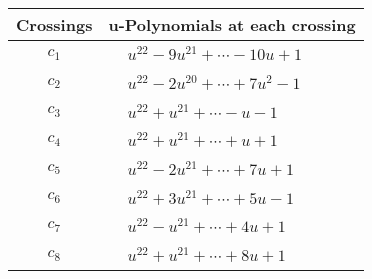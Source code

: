 \documentclass[1p]{elsarticle_modified}
\theoremstyle{definition}
\begin{document}
\begin{tabular}{m{50pt}|m{274pt}}
Crossings & \hspace{64pt}u-Polynomials at each crossing \\
\hline $$\begin{aligned}c_{1}\end{aligned}$$&$\begin{aligned}
&u^{22}-9 u^{21}+\cdots-10 u+1
\end{aligned}$\\
\hline $$\begin{aligned}c_{2}\end{aligned}$$&$\begin{aligned}
&u^{22}-2 u^{20}+\cdots+7 u^2-1
\end{aligned}$\\
\hline $$\begin{aligned}c_{3}\end{aligned}$$&$\begin{aligned}
&u^{22}+u^{21}+\cdots- u-1
\end{aligned}$\\
\hline $$\begin{aligned}c_{4}\end{aligned}$$&$\begin{aligned}
&u^{22}+u^{21}+\cdots+u+1
\end{aligned}$\\
\hline $$\begin{aligned}c_{5}\end{aligned}$$&$\begin{aligned}
&u^{22}-2 u^{21}+\cdots+7 u+1
\end{aligned}$\\
\hline $$\begin{aligned}c_{6}\end{aligned}$$&$\begin{aligned}
&u^{22}+3 u^{21}+\cdots+5 u-1
\end{aligned}$\\
\hline $$\begin{aligned}c_{7}\end{aligned}$$&$\begin{aligned}
&u^{22}- u^{21}+\cdots+4 u+1
\end{aligned}$\\
\hline $$\begin{aligned}c_{8}\end{aligned}$$&$\begin{aligned}
&u^{22}+u^{21}+\cdots+8 u+1
\end{aligned}$\\

\end{tabular}
\end{document}

